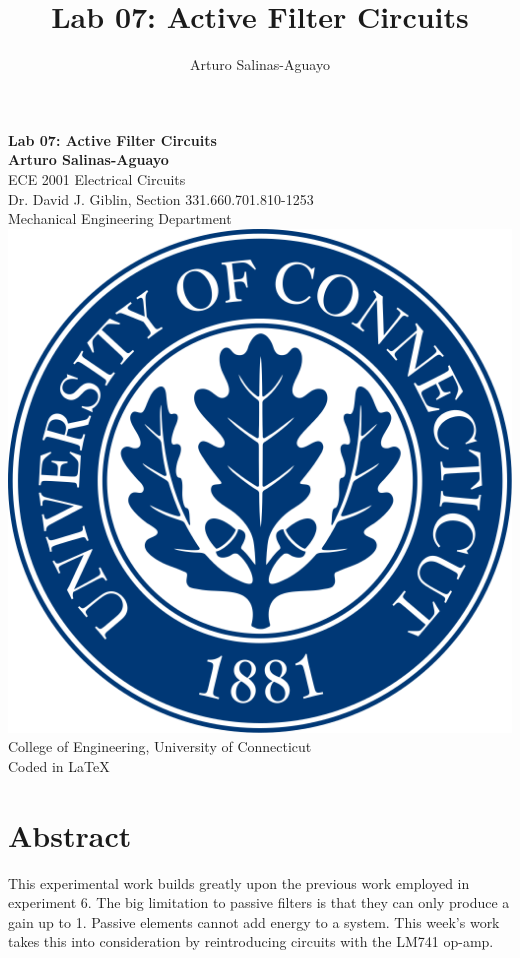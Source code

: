 \documentclass[12pt]{article}
\author{Arturo Salinas-Aguayo}
\title{Lab 07: Active Filter Circuits}
\begin{document}
\newcommand{\closure}[2][3]{%
	{}\mkern#1mu\overline{\mkern-#1mu#2}}
\newcommand\ncoverline[1]{\mkern1mu\overline{\mkern-1mu#1\mkern-1mu}\mkern1mu}
\begin{titlepage}
	\centering
	\vspace*{3cm}
	\huge\textbf{Lab 07: Active Filter Circuits}\\

	\vspace{5cm}
	\Large\textbf{Arturo Salinas-Aguayo}\\
	\normalsize
	ECE 2001 Electrical Circuits\\
	Dr. David J. Giblin, Section 331.660.701.810-1253\\
	Mechanical Engineering Department
	\vfill
	\includegraphics[scale=0.1]{uconnlogo}\\
	College of Engineering, University of Connecticut\\
	\scriptsize{Coded in \LaTeX}
	\vspace*{1cm}
\end{titlepage}
\tableofcontents
\newpage

\section{Abstract}
This experimental work builds greatly upon the previous work employed in
experiment 6. The big limitation to passive filters is that they can only
produce a gain up to 1. Passive elements cannot add energy to a system. This
week's work takes this into consideration by reintroducing circuits with the
LM741 op-amp.
\end{document}
